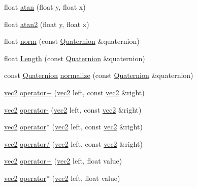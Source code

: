 \begin{DoxyCompactItemize}
\item 
float \hyperlink{namespacespork_1_1maths_a0e982679f0d9b9d9509069a195bb0763}{atan} (float y, float x)
\item 
float \hyperlink{namespacespork_1_1maths_afde139a899ca339b136632896e02c499}{atan2} (float y, float x)
\item 
float \hyperlink{namespacespork_1_1maths_a141bfeeb49979c58682a3088bfdbc329}{norm} (const \hyperlink{structspork_1_1maths_1_1_quaternion}{Quaternion} \&quaternion)
\item 
float \hyperlink{namespacespork_1_1maths_a7accffaa77c9ecaba22d3c5784fd550b}{Length} (const \hyperlink{structspork_1_1maths_1_1_quaternion}{Quaternion} \&quaternion)
\item 
const \hyperlink{structspork_1_1maths_1_1_quaternion}{Quaternion} \hyperlink{namespacespork_1_1maths_aa510abe7e7c68b015aa45c046395967a}{normalize} (const \hyperlink{structspork_1_1maths_1_1_quaternion}{Quaternion} \&quaternion)
\item 
\hyperlink{structspork_1_1maths_1_1vec2}{vec2} \hyperlink{namespacespork_1_1maths_aa0b8eecee8b72ea828601a9dc89fe6f7}{operator+} (\hyperlink{structspork_1_1maths_1_1vec2}{vec2} left, const \hyperlink{structspork_1_1maths_1_1vec2}{vec2} \&right)
\item 
\hyperlink{structspork_1_1maths_1_1vec2}{vec2} \hyperlink{namespacespork_1_1maths_a89ebc59051b819b77bdca5c54469a2b8}{operator-\/} (\hyperlink{structspork_1_1maths_1_1vec2}{vec2} left, const \hyperlink{structspork_1_1maths_1_1vec2}{vec2} \&right)
\item 
\hyperlink{structspork_1_1maths_1_1vec2}{vec2} \hyperlink{namespacespork_1_1maths_ab48c905dee8a5a3699d0ef88aec5163d}{operator$\ast$} (\hyperlink{structspork_1_1maths_1_1vec2}{vec2} left, const \hyperlink{structspork_1_1maths_1_1vec2}{vec2} \&right)
\item 
\hyperlink{structspork_1_1maths_1_1vec2}{vec2} \hyperlink{namespacespork_1_1maths_ae491f51c3cf643faf35f44368b88a385}{operator/} (\hyperlink{structspork_1_1maths_1_1vec2}{vec2} left, const \hyperlink{structspork_1_1maths_1_1vec2}{vec2} \&right)
\item 
\hyperlink{structspork_1_1maths_1_1vec2}{vec2} \hyperlink{namespacespork_1_1maths_abca6a1c7a99727069e27bfa8db3421f1}{operator+} (\hyperlink{structspork_1_1maths_1_1vec2}{vec2} left, float value)
\item 
\hyperlink{structspork_1_1maths_1_1vec2}{vec2} \hyperlink{namespacespork_1_1maths_ad486891132edddc4fc717eda8cb371b0}{operator$\ast$} (\hyperlink{structspork_1_1maths_1_1vec2}{vec2} left, float value)

\end{DoxyCompactItemize}
